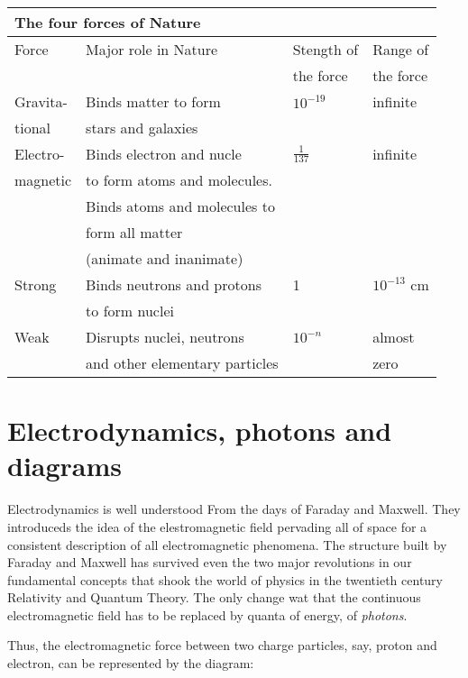 \begin{center}
\begin{tabular}{|llll|}
\hline
\multicolumn{4}{|l|}{{\bf The four forces of Nature}}\\
\hline
Force & Major role in Nature &Stength of  & Range of \\
      &                      &the force   & the force \\     
\hline
Gravita- & Binds matter to form  & $10^{-19}$ & infinite\\
tional   & stars and galaxies    &           &          \\
Electro- & Binds electron and nucle & $\frac{1}{137}$ & infinite \\
magnetic & to form atoms and molecules. &              &  \\
                &Binds atoms and molecules to  &              &   \\
                &form all matter &      &   \\ 
                &(animate and inanimate)& & \\
Strong & Binds neutrons and protons & 1 & $10^{-13}$ cm \\
       &  to form nuclei            &   &               \\
Weak & Disrupts nuclei, neutrons  &$10^{-n}$  & almost \\
     & and other elementary particles &       & zero   \\
\hline
\end{tabular}
\end{center}


\section*{Electrodynamics, photons and diagrams}

Electrodynamics is well understood From the days of Faraday and Maxwell. They introduceds the idea of the elestromagnetic field pervading all of space for a consistent description of all electromagnetic phenomena. The structure built by Faraday and Maxwell has survived even the two major revolutions in our fundamental concepts that shook the world of physics in the twentieth century Relativity and Quantum Theory. The only change wat that the continuous electromagnetic field has to be replaced by quanta of energy, of {\it photons}.

Thus, the electromagnetic force between two charge particles, say, proton and electron, can be represented by the diagram:

